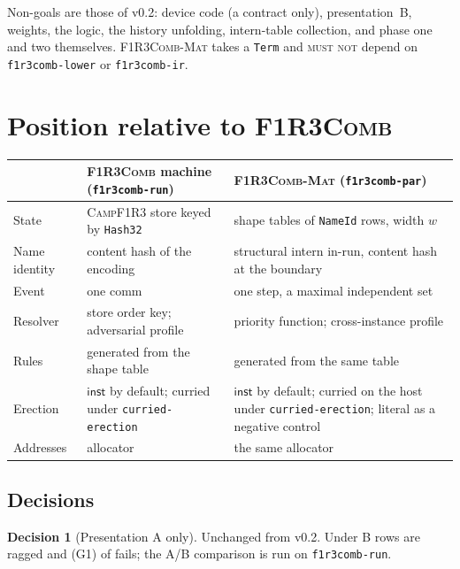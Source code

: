 \documentclass[11pt,a4paper]{article}
\newcommand{\code}[1]{\texttt{#1}}
\newcommand{\Comb}{\textsc{F1R3Comb}}
\newcommand{\Mat}{\textsc{F1R3Comb-Mat}}
\newcommand{\Camp}{\textsc{CampF1R3}}
\newcommand{\MUSTNOT}{\textsc{must not}}
\theoremstyle{definition}
\newtheorem{decision}[definition]{Decision}
\theoremstyle{plain}
\newcommand{\inst}{\mathsf{inst}}
\begin{document}
\noindent
Non-goals are those of v0.2: device code (a contract only), presentation~B,
weights, the logic, the history unfolding, intern-table collection, and phase
one and two themselves. \Mat{} takes a \code{Term} and \MUSTNOT{} depend on
\code{f1r3comb-lower} or \code{f1r3comb-ir}.

\section{Position relative to \Comb}\label{sec:position}

\begin{center}
\begin{tabularx}{\linewidth}{@{}l>{\raggedright\arraybackslash}X>{\raggedright\arraybackslash}X@{}}
\toprule
& \Comb{} machine (\code{f1r3comb-run}) & \Mat{} (\code{f1r3comb-par})\\
\midrule
State & \Camp{} store keyed by \code{Hash32} & shape tables of \code{NameId}
rows, width $w$\\
Name identity & content hash of the encoding & structural intern in-run,
content hash at the boundary\\
Event & one comm & one step, a maximal independent set\\
Resolver & store order key; adversarial profile \cite[Obl.~11.2]{combspec}
& priority function; cross-instance profile\\
Rules & generated from the shape table & generated from the same table\\
Erection & $\inst$ by default; curried under \code{curried-erection} &
$\inst$ by default; curried on the host under \code{curried-erection}; literal
as a negative control\\
Addresses & allocator \cite[Req.~9.6]{combspec} & the same allocator\\
\bottomrule
\end{tabularx}
\end{center}

\subsection{Decisions}

\begin{decision}[Presentation A only]\label{dec:aonly}
Unchanged from v0.2. Under B rows are ragged and (G1) of
\cite[\S2.1]{matnote} fails; the A/B comparison \cite[Obl.~11.12]{combspec}
is run on \code{f1r3comb-run}.
\end{decision}
\end{document}
